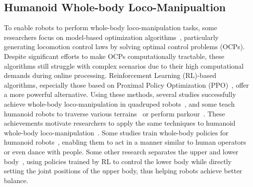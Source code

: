 \subsection{Humanoid Whole-body Loco-Manipualtion}

To enable robots to perform whole-body loco-manipulation tasks, some researchers focus on model-based optimization algorithms~\cite{miura1984dynamic,wensing2023optimization,moro2019whole,zhang2024whole,chignoli2021humanoid}, particularly generating locomotion control laws by solving optimal control problems (OCPs). Despite significant efforts to make OCPs computationally tractable, these algorithms still struggle with complex scenarios due to their high computational demands during online processing. Reinforcement Learning (RL)-based algorithms, especially those based on Proximal Policy Optimization (PPO)~\cite{schulman2017proximal}, offer a more powerful alternative. Using these methods, several studies successfully achieve whole-body loco-manipulation in quadruped robots~\cite{liu2024visual,pan2024roboduet,portela2024whole,ha2024umi}, and some teach humanoid robots to traverse various terrains~\cite{gu2024advancing,long2024learninghumanoidlocomotionperceptive,chen2024learning,dugar2024learning,li2024reinforcement,li2021reinforcement,liao2024berkeley,zhang2024wococo} or perform parkour~\cite{zhuang2024humanoid}. These achievements motivate researchers to apply the same techniques to humanoid whole-body loco-manipulation~\cite{gu2025humanoid}. Some studies train whole-body policies for humanoid robots~\cite{ji2024exbody2}, enabling them to act in a manner similar to human operators or even dance with people. Some other research separates the upper and lower body~\cite{cheng2024express,fu2024humanplus,he2024learning,he2024omnih2o,lu2024pmp}, using policies trained by RL to control the lower body while directly setting the joint positions of the upper body, thus helping robots achieve better balance. 
